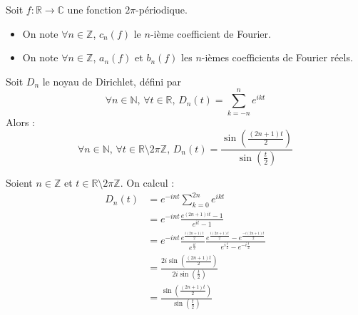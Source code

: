 



	
	\begin{notation}
		Soit $f : \mathbb{R} \rightarrow \mathbb{C}$ une fonction $2 \pi$-périodique.
		\begin{itemize}
			\item On note $\forall n \in \mathbb{Z}$, $c_n(f)$ le $n$-ième coefficient de Fourier.
			\item On note $\forall n \in \mathbb{Z}$, $a_n(f)$ et $b_n(f)$ les $n$-ièmes coefficients de Fourier réels.
		\end{itemize}
	\end{notation}

	
	\begin{lemma}
		\label{theoreme-de-dirichlet-1}
		Soit $D_n$ le noyau de Dirichlet, défini par
		\[ \forall n \in \mathbb{N}, \, \forall t \in \mathbb{R}, \, D_n(t) = \sum_{k=-n}^n e^{ikt} \]
		Alors :
		\[ \forall n \in \mathbb{N}, \, \forall t \in \mathbb{R} \setminus 2\pi\mathbb{Z}, \, D_n(t) = \frac{\sin \left ( \frac{(2n + 1)t}{2} \right)}{\sin \left ( \frac{t}{2} \right)} \]
	\end{lemma}

	\begin{demonstration}
		Soient $n \in \mathbb{Z}$ et $t \in \mathbb{R}\setminus 2\pi\mathbb{Z}$. On calcul :
		\begin{align*}
			D_n(t) &= e^{-int} \sum_{k=0}^{2n} e^{ikt} \\
			&= e^{-int} \frac{e^{(2n+1)it} - 1}{e^{it} - 1} \\
			&= e^{-int} \frac{e^{\frac{i (2n+1) t}{2}}}{e^{\frac{i t}{2}}} \frac{e^{\frac{i (2n+1) t}{2}} - e^{\frac{-i (2n+1) t}{2}}}{e^{i\frac{t}{2}} - e^{-i \frac{t}{2}}} \\
			&= \frac{2i \sin \left ( \frac{(2n + 1)t}{2} \right)}{2i \sin \left ( \frac{t}{2} \right)} \\
			&= \frac{\sin \left ( \frac{(2n + 1)t}{2} \right)}{\sin \left ( \frac{t}{2} \right)}
		\end{align*}
	\end{demonstration}

